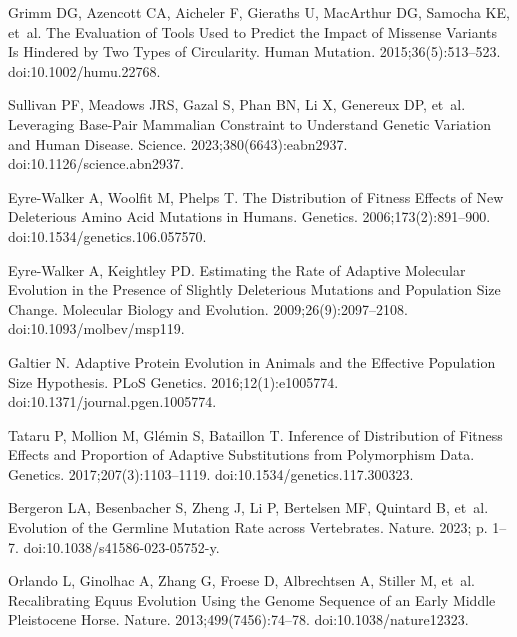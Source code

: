 \documentclass[10pt,letterpaper]{article}
\begin{document}
\begin{thebibliography}{10}
Grimm DG, Azencott CA, Aicheler F, Gieraths U, MacArthur DG, Samocha KE, et~al.
\newblock The {{Evaluation}} of {{Tools Used}} to {{Predict}} the {{Impact}} of
{{Missense Variants Is Hindered}} by {{Two Types}} of {{Circularity}}.
\newblock Human Mutation. 2015;36(5):513--523.
\newblock doi:{10.1002/humu.22768}.

Sullivan PF, Meadows JRS, Gazal S, Phan BN, Li X, Genereux DP, et~al.
\newblock Leveraging Base-Pair Mammalian Constraint to Understand Genetic
Variation and Human Disease.
\newblock Science. 2023;380(6643):eabn2937.
\newblock doi:{10.1126/science.abn2937}.

{Eyre-Walker} A, Woolfit M, Phelps T.
\newblock The Distribution of Fitness Effects of New Deleterious Amino Acid
Mutations in Humans.
\newblock Genetics. 2006;173(2):891--900.
\newblock doi:{10.1534/genetics.106.057570}.

{Eyre-Walker} A, Keightley PD.
\newblock Estimating the {{Rate}} of {{Adaptive Molecular Evolution}} in the
{{Presence}} of {{Slightly Deleterious Mutations}} and {{Population Size
Change}}.
\newblock Molecular Biology and Evolution. 2009;26(9):2097--2108.
\newblock doi:{10.1093/molbev/msp119}.

Galtier N.
\newblock Adaptive Protein Evolution in Animals and the Effective Population
Size Hypothesis.
\newblock PLoS Genetics. 2016;12(1):e1005774.
\newblock doi:{10.1371/journal.pgen.1005774}.

Tataru P, Mollion M, Gl{\'e}min S, Bataillon T.
\newblock Inference of Distribution of Fitness Effects and Proportion of
Adaptive Substitutions from Polymorphism Data.
\newblock Genetics. 2017;207(3):1103--1119.
\newblock doi:{10.1534/genetics.117.300323}.

Bergeron LA, Besenbacher S, Zheng J, Li P, Bertelsen MF, Quintard B, et~al.
\newblock Evolution of the Germline Mutation Rate across Vertebrates.
\newblock Nature. 2023; p. 1--7.
\newblock doi:{10.1038/s41586-023-05752-y}.

Orlando L, Ginolhac A, Zhang G, Froese D, Albrechtsen A, Stiller M, et~al.
\newblock Recalibrating {{Equus}} Evolution Using the Genome Sequence of an
Early {{Middle Pleistocene}} Horse.
\newblock Nature. 2013;499(7456):74--78.
\newblock doi:{10.1038/nature12323}.


\end{thebibliography}
\end{document}
